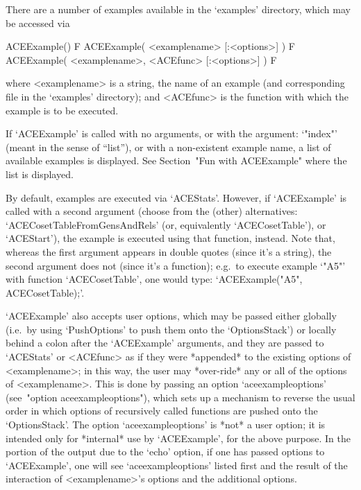 
There are a number of examples available in the `examples'  directory,
which may be accessed via

\>ACEExample() F
\>ACEExample( <examplename> [:<options>] ) F
\>ACEExample( <examplename>, <ACEfunc> [:<options>] ) F

where  <examplename>  is  a  string,  the  name  of  an  example  (and
corresponding file in the `examples' directory); and <ACEfunc> is  the
{\ACE} function with which the example is to be executed. 

If `ACEExample' is called with no arguments,  or  with  the  argument:
`"index"' (meant in the sense of ``list''),  or  with  a  non-existent
example  name,  a  list  of  available  examples  is  displayed.   See
Section~"Fun with ACEExample" where the list is displayed.

By  default,  examples  are  executed  via  `ACEStats'.  However,   if
`ACEExample' is called with a second argument (choose from the (other)
alternatives:   `ACECosetTableFromGensAndRels'    (or,    equivalently
`ACECosetTable'), or `ACEStart'), the example is executed  using  that
function, instead. Note that, whereas the first  argument  appears  in
double quotes (since it's a string),  the  second  argument  does  not
(since it's a function); e.g.~to execute example `"A5"' with  function
`ACECosetTable', one would type: `ACEExample("A5", ACECosetTable);'.

`ACEExample' also accepts user options, which  may  be  passed  either
globally  (i.e.~by  using  `PushOptions'  to  push   them   onto   the
`OptionsStack') or locally  behind  a  colon  after  the  `ACEExample'
arguments, and they are passed to `ACEStats' or <ACEfunc> as  if  they
were *appended* to the existing options of <examplename>; in this way,
the user may *over-ride* any or all of the options  of  <examplename>.
This is done by passing  an  option  `aceexampleoptions'  (see~"option
aceexampleoptions"), which sets up a mechanism to  reverse  the  usual
order in which options of recursively called functions are pushed onto
the `OptionsStack'. The option `aceexampleoptions'  is  *not*  a  user
option; it is intended only for *internal* use  by  `ACEExample',  for
the above purpose. In the portion of the  output  due  to  the  `echo'
option, if one has  passed  options  to  `ACEExample',  one  will  see
`aceexampleoptions' listed first and the result of the interaction  of
<examplename>'s options and the additional options.

